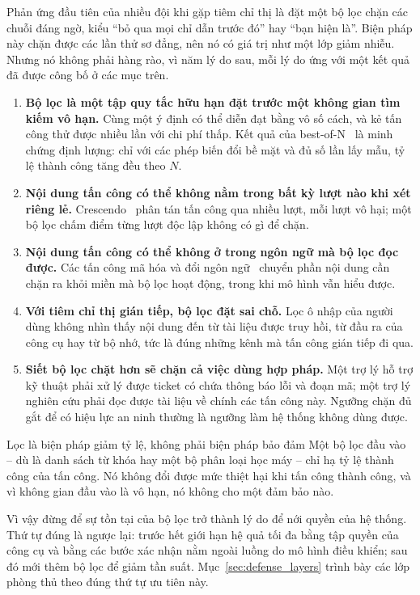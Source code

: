 Phản ứng đầu tiên của nhiều đội khi gặp tiêm chỉ thị là đặt một bộ lọc chặn các chuỗi đáng ngờ, kiểu ``bỏ qua mọi chỉ dẫn trước đó'' hay ``bạn hiện là''. Biện pháp này chặn được các lần thử sơ đẳng, nên nó có giá trị như một lớp giảm nhiễu. Nhưng nó không phải hàng rào, vì năm lý do sau, mỗi lý do ứng với một kết quả đã được công bố ở các mục trên.

\begin{enumerate}
	\item \textbf{Bộ lọc là một tập quy tắc hữu hạn đặt trước một không gian tìm kiếm vô hạn.} Cùng một ý định có thể diễn đạt bằng vô số cách, và kẻ tấn công thử được nhiều lần với chi phí thấp. Kết quả của best-of-N~\cite{hughes2024bon} là minh chứng định lượng: chỉ với các phép biến đổi bề mặt và đủ số lần lấy mẫu, tỷ lệ thành công tăng đều theo $N$.
	\item \textbf{Nội dung tấn công có thể không nằm trong bất kỳ lượt nào khi xét riêng lẻ.} Crescendo~\cite{russinovich2024crescendo} phân tán tấn công qua nhiều lượt, mỗi lượt vô hại; một bộ lọc chấm điểm từng lượt độc lập không có gì để chặn.
	\item \textbf{Nội dung tấn công có thể không ở trong ngôn ngữ mà bộ lọc đọc được.} Các tấn công mã hóa và đổi ngôn ngữ~\cite{wei2023jailbroken, yong2023lowresource} chuyển phần nội dung cần chặn ra khỏi miền mà bộ lọc hoạt động, trong khi mô hình vẫn hiểu được.
	\item \textbf{Với tiêm chỉ thị gián tiếp, bộ lọc đặt sai chỗ.} Lọc ô nhập của người dùng không nhìn thấy nội dung đến từ tài liệu được truy hồi, từ đầu ra của công cụ hay từ bộ nhớ, tức là đúng những kênh mà tấn công gián tiếp đi qua.
	\item \textbf{Siết bộ lọc chặt hơn sẽ chặn cả việc dùng hợp pháp.} Một trợ lý hỗ trợ kỹ thuật phải xử lý được ticket có chứa thông báo lỗi và đoạn mã; một trợ lý nghiên cứu phải đọc được tài liệu về chính các tấn công này. Ngưỡng chặn đủ gắt để có hiệu lực an ninh thường là ngưỡng làm hệ thống không dùng được.
\end{enumerate}

\begin{pitfall}{Lọc là biện pháp giảm tỷ lệ, không phải biện pháp bảo đảm}
Một bộ lọc đầu vào -- dù là danh sách từ khóa hay một bộ phân loại học máy -- chỉ hạ tỷ lệ thành công của tấn công. Nó không đổi được mức thiệt hại khi tấn công thành công, và vì không gian đầu vào là vô hạn, nó không cho một đảm bảo nào.

Vì vậy đừng để sự tồn tại của bộ lọc trở thành lý do để nới quyền của hệ thống. Thứ tự đúng là ngược lại: trước hết giới hạn hệ quả tối đa bằng tập quyền của công cụ và bằng các bước xác nhận nằm ngoài luồng do mô hình điều khiển; sau đó mới thêm bộ lọc để giảm tần suất. Mục~\ref{sec:defense_layers} trình bày các lớp phòng thủ theo đúng thứ tự ưu tiên này.
\end{pitfall}

